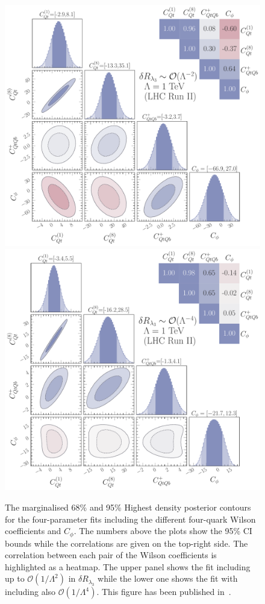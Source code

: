 \begin{figure}[h!]
	\begin{center}
		\includegraphics[width=.6\linewidth]{fig/4param_fit_LHC_RunII_l3L_rge}\\
		\includegraphics[width=.6\linewidth]{fig/4param_fit_LHC_RunII_l3Q_rge}
	\end{center}
	\caption{The marginalised 68\% and 95\% Highest density posterior contours for the four-parameter fits including the different four-quark Wilson coefficients and $C_\phi$. The numbers above the plots show the 95\% CI bounds while the correlations are given on the top-right side. The correlation between each pair of the Wilson coefficients is highlighted as a heatmap.
		The upper panel shows the fit including up to $\mathcal{O}(1/\Lambda^2)$ in $\delta R_{\lambda_3}$  while the lower one shows the fit with including also  $\mathcal{O}(1/\Lambda^4)$.  This figure has been published in~\cite{Alasfar:2022zyr}. \label{fig:4param} }
\end{figure}
